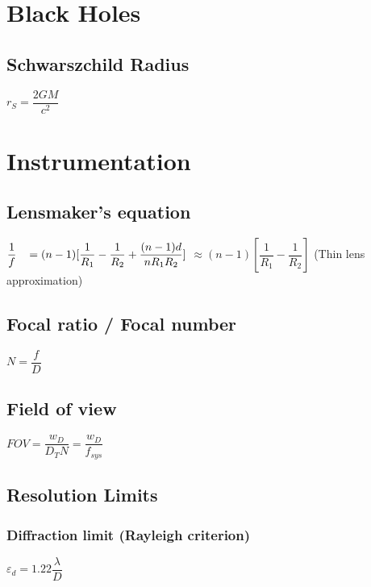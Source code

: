 	\section{Black Holes}

\subsection{Schwarszchild Radius}		
\begin{itemize}
\itemt \( r_S = \dfrac{2GM}{c^2} \)
\end{itemize}

	\section{Instrumentation}

\subsection{Lensmaker's equation}
\begin{itemize}
\itemt \( \dfrac{1}{f} \hspace*{0.3cm} = (n-1)[\dfrac{1}{R_1} - \dfrac{1}{R_2}+\dfrac{(n-1)d}{nR_1R_2}] \)
\subitem \hspace*{0.85cm} \( \approx (n-1)[\dfrac{1}{R_1} - \dfrac{1}{R_2}] \) \tab     (Thin lens approximation)
\end{itemize}

\subsection{Focal ratio / Focal number}
\begin{itemize}
\itemt \( N = \dfrac{f}{D} \)
\end{itemize}			

\subsection{Field of view}		
\begin{itemize}
\itemt \( FOV = \dfrac{w_D}{D_T N} = \dfrac{w_D}{f_{sys}} \)
\end{itemize}

\subsection{Resolution Limits}		

\subsubsection{Diffraction limit (Rayleigh criterion)}			
\begin{itemize}
\itemt \( \varepsilon_d = 1.22 \dfrac{\lambda}{D} \)
\end{itemize}			

